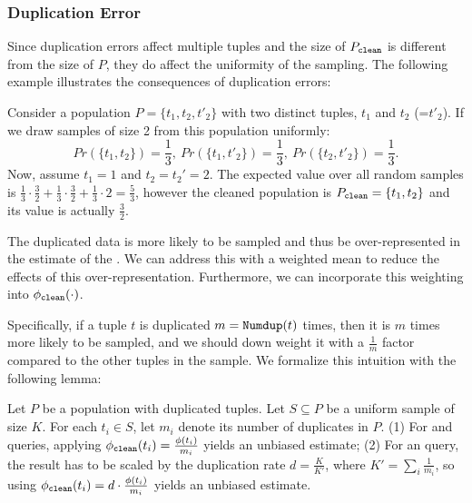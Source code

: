 \subsubsection{Duplication Error}\label{subsec:challenges}
Since duplication errors affect multiple tuples and the size of $P_{\clean}$ is different from the size of $P$, they do affect the uniformity of the sampling.
The following example illustrates the consequences of duplication errors:
\begin{example}
Consider a population $P = \{t_1, t_2, t'_2\}$ with two distinct tuples, $t_1$ and $t_2$ (=$t'_2$).
If we draw samples of size 2 from this population uniformly:
\[ Pr(\{t_1, t_2\})=\frac{1}{3},\ Pr(\{t_1, t'_2\})=\frac{1}{3},\ Pr(\{t_2, t'_2\})=\frac{1}{3}. \]
Now, assume $t_1 = 1$ and $t_2 = t_2' = 2$.
The expected \mean value over all random samples is $\frac{1}{3}\cdot\frac{3}{2}+\frac{1}{3}\cdot\frac{3}{2}+\frac{1}{3}\cdot2=\frac{5}{3}$, however the cleaned population is $P_{\clean} = \{t_1, t_2\}$ and its \mean value is actually $\frac{3}{2}$. %
\end{example}
The duplicated data is more likely to be sampled and thus be over-represented in the estimate of the \mean.
We can address this with a weighted mean to reduce the effects of this over-representation.
Furthermore, we can incorporate this weighting into $\saqpplusfunc(\cdot)$.

Specifically, if a tuple $t$ is duplicated $m=\Dedup{t}{P}$ times, then it is $m$ times more likely to be sampled, and we should down weight it with a $\frac{1}{m}$ factor compared to the other tuples in the sample.
We formalize this intuition with the following lemma:
\begin{lemma}\label{lem:derror}
Let $P$ be a population with duplicated tuples. %
Let $S \subseteq P$ be a uniform sample of size $K$.
For each $t_{i}\in S$, let $m_i$ denote its number of duplicates in $P$.
 (1) For \sumfunc and \countfunc queries, applying $\saqpplusfunc(t_i)=\frac{\saqpfunc(t_i)}{m_i}$ yields an unbiased estimate;
(2) For an \avgfunc query, the result has to be scaled by the duplication rate $d=\frac{K}{K'}$,
where $K'=\sum_i\frac{1}{m_i}$, so using $\saqpplusfunc(t_i)=d\cdot\frac{\saqpfunc(t_i)}{m_i}$ yields an unbiased estimate.
\end{lemma}

